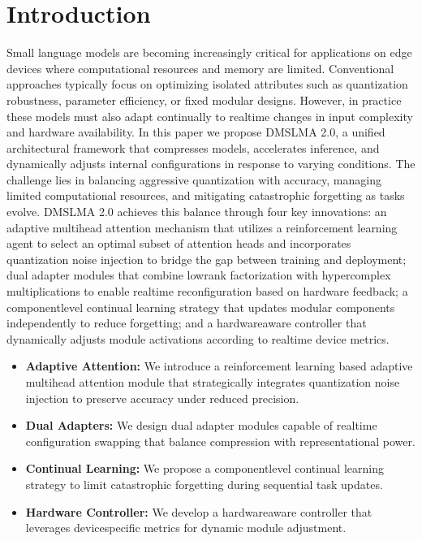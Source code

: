 \documentclass{article} %
\begin{document}
\section{Introduction}
\label{sec:intro}
Small language models are becoming increasingly critical for applications on edge devices where computational resources and memory are limited. Conventional approaches typically focus on optimizing isolated attributes such as quantization robustness, parameter efficiency, or fixed modular designs. However, in practice these models must also adapt continually to real\-time changes in input complexity and hardware availability. In this paper we propose DMS\-LMA 2.0, a unified architectural framework that compresses models, accelerates inference, and dynamically adjusts internal configurations in response to varying conditions. The challenge lies in balancing aggressive quantization with accuracy, managing limited computational resources, and mitigating catastrophic forgetting as tasks evolve. DMS\-LMA 2.0 achieves this balance through four key innovations: an adaptive multi\-head attention mechanism that utilizes a reinforcement learning agent to select an optimal subset of attention heads and incorporates quantization noise injection to bridge the gap between training and deployment; dual adapter modules that combine low\-rank factorization with hypercomplex multiplications to enable real\-time reconfiguration based on hardware feedback; a component\-level continual learning strategy that updates modular components independently to reduce forgetting; and a hardware\-aware controller that dynamically adjusts module activations according to real\-time device metrics.

\begin{itemize}
  \item \textbf{Adaptive Attention:} We introduce a reinforcement learning based adaptive multi\-head attention module that strategically integrates quantization noise injection to preserve accuracy under reduced precision.
  \item \textbf{Dual Adapters:} We design dual adapter modules capable of real\-time configuration swapping that balance compression with representational power.
  \item \textbf{Continual Learning:} We propose a component\-level continual learning strategy to limit catastrophic forgetting during sequential task updates.
  \item \textbf{Hardware Controller:} We develop a hardware\-aware controller that leverages device\-specific metrics for dynamic module adjustment.
\end{itemize}
\end{document}

